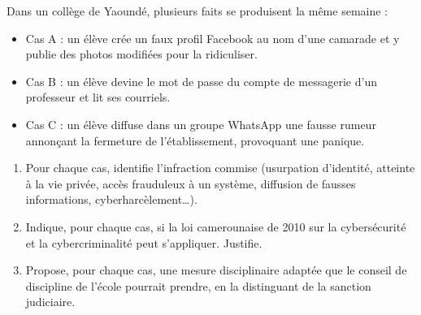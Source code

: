 \documentclass[11pt]{article}
\begin{document}
\begin{exercice}
Dans un collège de Yaoundé, plusieurs faits se produisent la même semaine :
\begin{itemize}
\item Cas A : un élève crée un faux profil Facebook au nom d'une camarade et y publie des photos modifiées pour la ridiculiser.
\item Cas B : un élève devine le mot de passe du compte de messagerie d'un professeur et lit ses courriels.
\item Cas C : un élève diffuse dans un groupe WhatsApp une fausse rumeur annonçant la fermeture de l'établissement, provoquant une panique.
\end{itemize}
\begin{enumerate}
\item Pour chaque cas, identifie l'infraction commise (usurpation d'identité, atteinte à la vie privée, accès frauduleux à un système, diffusion de fausses informations, cyberharcèlement\ldots).
\item Indique, pour chaque cas, si la loi camerounaise de 2010 sur la cybersécurité et la cybercriminalité peut s'appliquer. Justifie.
\item Propose, pour chaque cas, une mesure disciplinaire adaptée que le conseil de discipline de l'école pourrait prendre, en la distinguant de la sanction judiciaire.
\end{enumerate}
\end{exercice}
\end{document}
